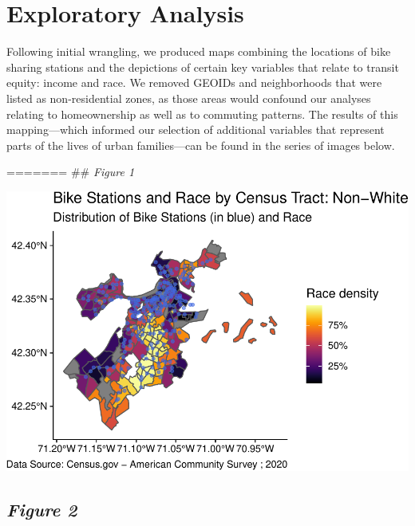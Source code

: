 \documentclass[
  12pt,
]{article}
\begin{document}
\newpage

\hypertarget{exploratory-analysis}{%
\section{Exploratory Analysis}\label{exploratory-analysis}}

Following initial wrangling, we produced maps combining the locations of
bike sharing stations and the depictions of certain key variables that
relate to transit equity: income and race. We removed GEOIDs and
neighborhoods that were listed as non-residential zones, as those areas
would confound our analyses relating to homeownership as well as to
commuting patterns. The results of this mapping---which informed our
selection of additional variables that represent parts of the lives of
urban families---can be found in the series of images below.

======= \#\# \emph{Figure 1}

\begin{flushleft}\includegraphics{Project_Template_files/figure-latex/develop plots race non-white-1} \end{flushleft}
\newpage

\hypertarget{figure-2}{%
\subsection{\texorpdfstring{\emph{Figure 2}}{Figure 2}}\label{figure-2}}
\end{document}
